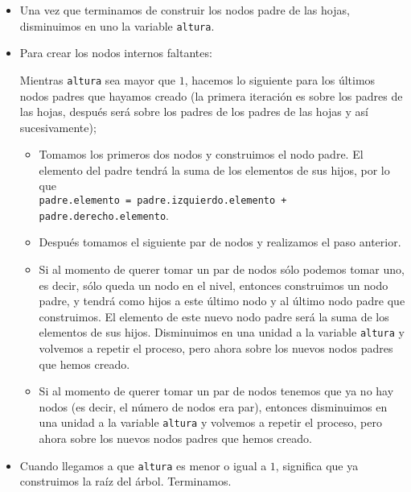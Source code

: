 \documentclass[letterpaper,11pt]{article}
\begin{document}
\begin{enumerate}
\begin{itemize}
\begin{itemize}
            \item Una vez que terminamos de construir los nodos padre de las
            hojas, disminuimos en uno la variable \texttt{altura}.

            \item Para crear los nodos internos faltantes:

            Mientras \texttt{altura} sea mayor que $1$, hacemos lo siguiente 
            para los últimos nodos padres que hayamos creado (la primera 
            iteración es sobre los padres de las hojas, después será sobre 
            los padres de los padres de las hojas y así sucesivamente); 
            \begin{itemize}
                \item Tomamos los primeros dos nodos y construimos el nodo 
                padre. El elemento del padre tendrá la suma de los elementos 
                de sus hijos, por lo que \\ 
                \texttt{padre.elemento = padre.izquierdo.elemento + 
                padre.derecho.elemento}.
    
                \item Después tomamos el siguiente par de nodos y realizamos 
                el paso anterior. 
                
                \item Si al momento de querer tomar un par de nodos sólo podemos 
                tomar uno, es decir, sólo queda un nodo en el nivel, entonces 
                construimos un nodo padre, y tendrá como hijos a este último nodo 
                y al último nodo padre que construimos. El elemento de este 
                nuevo nodo padre será la suma de los elementos de sus hijos. 
                Disminuimos en una unidad a la variable \texttt{altura} y 
                volvemos a repetir el proceso, pero ahora sobre los nuevos nodos 
                padres que hemos creado.

                \item Si al momento de querer tomar un par de nodos tenemos 
                que ya no hay nodos (es decir, el número de nodos era par), 
                entonces disminuimos en una unidad a la variable \texttt{altura}
                y volvemos a repetir el proceso, pero ahora sobre los nuevos 
                nodos padres que hemos creado. 
            \end{itemize}

            \item Cuando llegamos a que \texttt{altura} es menor o igual a $1$, 
            significa que ya construimos la raíz del árbol. Terminamos.
        \end{itemize}


\end{itemize}
\end{enumerate}
\end{document}

